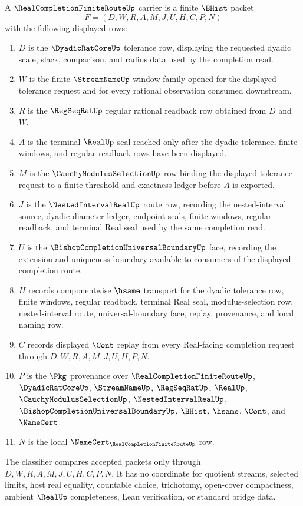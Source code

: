 \begin{definition}
\label{def:real-completion-finite-route-carrier}
A $\RealCompletionFiniteRouteUp$ carrier is a finite $\BHist$ packet
$$
F=(D,W,R,A,M,J,U,H,C,P,N)
$$
with the following displayed rows:
\begin{enumerate}
\item $D$ is the $\DyadicRatCoreUp$ tolerance row, displaying the requested dyadic scale, slack, comparison, and radius data used by the completion read.
\item $W$ is the finite $\StreamNameUp$ window family opened for the displayed tolerance request and for every rational observation consumed downstream.
\item $R$ is the $\RegSeqRatUp$ regular rational readback row obtained from $D$ and $W$.
\item $A$ is the terminal $\RealUp$ seal reached only after the dyadic tolerance, finite windows, and regular readback rows have been displayed.
\item $M$ is the $\CauchyModulusSelectionUp$ row binding the displayed tolerance request to a finite threshold and exactness ledger before $A$ is exported.
\item $J$ is the $\NestedIntervalRealUp$ route row, recording the nested-interval source, dyadic diameter ledger, endpoint seals, finite windows, regular readback, and terminal Real seal used by the same completion read.
\item $U$ is the $\BishopCompletionUniversalBoundaryUp$ face, recording the extension and uniqueness boundary available to consumers of the displayed completion route.
\item $H$ records componentwise $\hsame$ transport for the dyadic tolerance row, finite windows, regular readback, terminal Real seal, modulus-selection row, nested-interval route, universal-boundary face, replay, provenance, and local naming row.
\item $C$ records displayed $\Cont$ replay from every Real-facing completion request through $D,W,R,A,M,J,U,H,P,N$.
\item $P$ is the $\Pkg$ provenance over $\RealCompletionFiniteRouteUp$, $\DyadicRatCoreUp$, $\StreamNameUp$, $\RegSeqRatUp$, $\RealUp$, $\CauchyModulusSelectionUp$, $\NestedIntervalRealUp$, $\BishopCompletionUniversalBoundaryUp$, $\BHist$, $\hsame$, $\Cont$, and $\NameCert$.
\item $N$ is the local $\NameCert_{\RealCompletionFiniteRouteUp}$ row.
\end{enumerate}
The classifier compares accepted packets only through $D,W,R,A,M,J,U,H,C,P,N$. It has no coordinate for quotient streams, selected limits, host real equality, countable choice, trichotomy, open-cover compactness, ambient $\RealUp$ completeness, Lean verification, or standard bridge data.
\end{definition}

